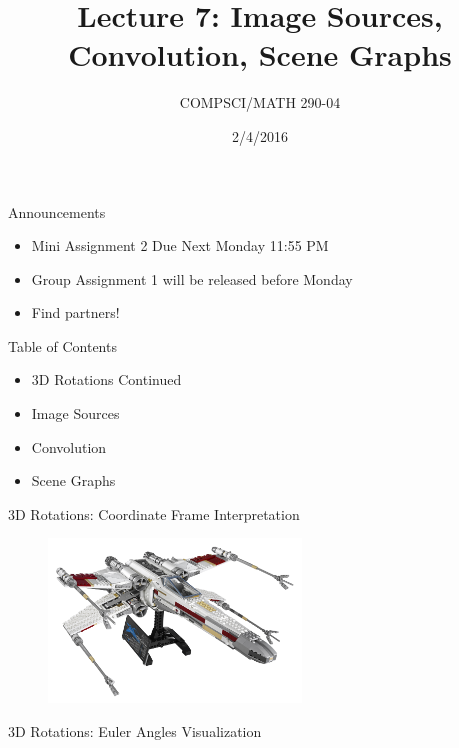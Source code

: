 \documentclass{beamer}
\title{Lecture 7: Image Sources, Convolution, Scene Graphs}
\date{2/4/2016}
\institute{Chris Tralie, Duke University}
\author{COMPSCI/MATH 290-04}
\begin{document}
\frame{\titlepage}

\begin{frame}{Announcements}

\begin{itemize}[label=$\blacktriangleright$]
    \item Mini Assignment 2 Due Next Monday 11:55 PM
    \item Group Assignment 1 will be released before Monday
    \item Find partners!
\end{itemize}

\end{frame}

\begin{frame}{Table of Contents}

\begin{itemize}[label=$\blacktriangleright$]
	\item 3D Rotations Continued
\end{itemize}
\begin{itemize}[label=$\vartriangleright$]
    \item Image Sources
	\item Convolution
	\item Scene Graphs
\end{itemize}

\end{frame}

\begin{frame}{3D Rotations: Coordinate Frame Interpretation}

\begin{figure}[t]
    \includegraphics[width=0.6\textwidth]{XWing.jpg}
\end{figure}

\end{frame}


\begin{frame}{3D Rotations: Euler Angles Visualization}

\end{frame}
\end{document}
